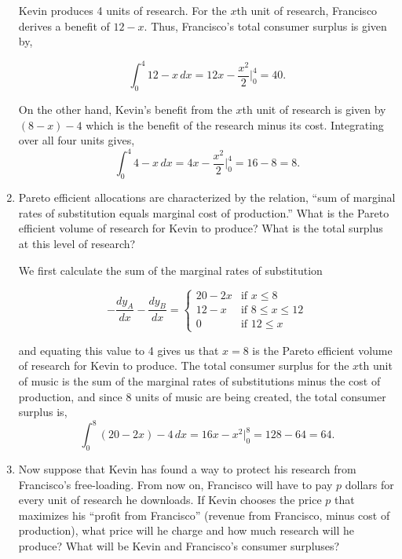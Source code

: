 \documentclass[11pt]{article}
\begin{document}
\begin{enumerate}
\begin{sol}
Kevin produces 4 units of research. For the $x$th unit of research, Francisco
derives a benefit of $12-x$. Thus, Francisco's total consumer surplus is given
by,

$$\int_0^4 12- x\, dx = 12x - \dfrac{x^2}{2} \bigg|_0^4 = \boxed{40}.$$

On the other hand, Kevin's benefit from the $x$th unit of research is given by
$(8-x) - 4$ which is the benefit of the research minus its cost. Integrating
over all four units gives,
\[ \int_0^4 4 - x \, dx = 4x - \frac{x^2}{2} \bigg|^4_0 = 16 - 8 = \boxed{8}.\]

\end{sol}


\item Pareto efficient allocations are characterized by the relation, ``sum of
marginal rates of substitution equals marginal cost of production.'' What is the
Pareto efficient volume of research for Kevin to produce? What is the total
surplus at this level of research?

\begin{sol}
We first calculate the sum of the marginal rates of substitution

\[ -\dfrac{dy_A}{dx} - \dfrac{dy_B}{dx} = 
\left\{ \begin{array}{ll} 
  20 - 2x & \text{if } x \le 8 \\
  12 - x & \text{if } 8 \le x \le 12 \\
  0 & \text{if } 12 \le x
\end{array} \right. \]

and equating this value to 4 gives us that $\boxed{x=8}$ is the Pareto efficient
volume of research for Kevin to produce. The total consumer surplus for the
$x$th unit of music is the sum of the marginal rates of substitutions minus the
cost of production, and since 8 units of music are being created, the total
consumer surplus is,
\[ \int_0^8 (20 - 2x) - 4 \, dx = 16x - x^2 \bigg|^8_0 = 128 - 64 = \boxed{64}.\]
\end{sol}

\item Now suppose that Kevin has found a way to protect his research from
Francisco's free-loading. From now on, Francisco will have to pay $p$ dollars
for every unit of research he downloads. If Kevin chooses the price $p$ that
maximizes his ``profit from Francisco'' (revenue from Francisco, minus cost of
production), what price will he charge and how much research will he produce?
What will be Kevin and Francisco's consumer surpluses?


\end{enumerate}
\end{document}

